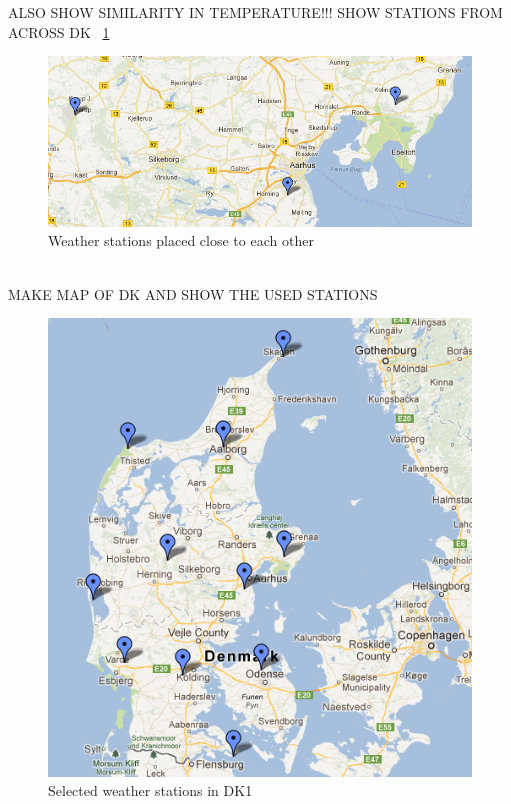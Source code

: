 ALSO SHOW SIMILARITY IN TEMPERATURE!!!
SHOW STATIONS FROM ACROSS DK ~\ref{fig:closeStations}
\begin{figure}[h!]
\centering
\includegraphics[width=0.99\linewidth,natwidth=898,natheight=587]{billeder/KarupAarhusSydOgLufthavn.png}
\caption{Weather stations placed close to each other}
\label{fig:closeStations}
\end{figure}
\\[0.5cm]
MAKE MAP OF DK AND SHOW THE USED STATIONS
\begin{figure}[h!]
\centering
\includegraphics[width=0.99\linewidth,natwidth=898,natheight=587]{billeder/stations4average.png}
\caption{Selected weather stations in DK1}
\label{fig:stations4average}
\end{figure}